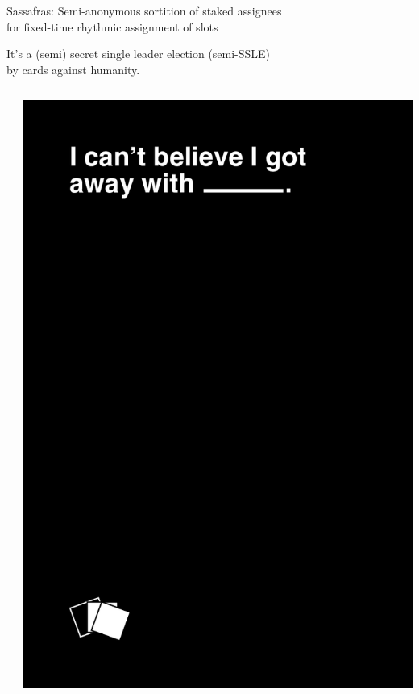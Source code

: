 \documentclass{beamer}
\begin{document}
\begin{frame}

Sassafras: Semi-anonymous sortition of staked assignees \\
\hspace{5pt} for fixed-time rhythmic assignment of slots

\bigskip

It's a (semi) secret single leader election (semi-SSLE) \\
\hspace{5pt} by cards against humanity.

\bigskip


\begin{columns}
	\begin{column}[t]{0.1\textwidth}
	\end{column}
	\begin{column}[t]{0.3\textwidth}
		\includegraphics[width=.9\textwidth]{black_FRONT012.png} %

\end{column}
\end{columns}
\end{frame}
\end{document}

